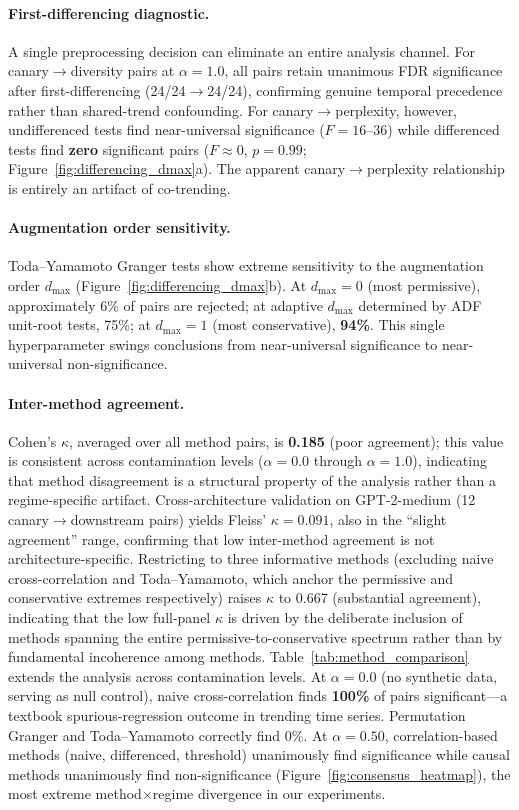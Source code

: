 \paragraph{First-differencing diagnostic.}
A single preprocessing decision can eliminate an entire analysis channel.
For canary$\to$diversity pairs at $\alpha{=}1.0$, all pairs retain unanimous FDR significance after first-differencing (24/24$\to$24/24), confirming genuine temporal precedence rather than shared-trend confounding.
For canary$\to$perplexity, however, undifferenced tests find near-universal significance ($F{=}16$--$36$) while differenced tests find \textbf{zero} significant pairs ($F{\approx}0$, $p{=}0.99$; Figure~\ref{fig:differencing_dmax}a).
The apparent canary$\to$perplexity relationship is entirely an artifact of co-trending.

\paragraph{Augmentation order sensitivity.}
Toda--Yamamoto Granger tests show extreme sensitivity to the augmentation order $d_{\max}$ (Figure~\ref{fig:differencing_dmax}b).
At $d_{\max}{=}0$ (most permissive), approximately 6\% of pairs are rejected; at adaptive $d_{\max}$ determined by ADF unit-root tests, 75\%; at $d_{\max}{=}1$ (most conservative), \textbf{94\%}.
This single hyperparameter swings conclusions from near-universal significance to near-universal non-significance.

\paragraph{Inter-method agreement.}
Cohen's $\kappa$, averaged over all method pairs, is \textbf{0.185} (poor agreement); this value is consistent across contamination levels ($\alpha{=}0.0$ through $\alpha{=}1.0$), indicating that method disagreement is a structural property of the analysis rather than a regime-specific artifact.
Cross-architecture validation on GPT-2-medium (12 canary$\to$downstream pairs) yields Fleiss' $\kappa{=}0.091$, also in the ``slight agreement'' range, confirming that low inter-method agreement is not architecture-specific.
Restricting to three informative methods (excluding naive cross-correlation and Toda--Yamamoto, which anchor the permissive and conservative extremes respectively) raises $\kappa$ to 0.667 (substantial agreement), indicating that the low full-panel $\kappa$ is driven by the deliberate inclusion of methods spanning the entire permissive-to-conservative spectrum rather than by fundamental incoherence among methods.
Table~\ref{tab:method_comparison} extends the analysis across contamination levels.
At $\alpha{=}0.0$ (no synthetic data, serving as null control), naive cross-correlation finds \textbf{100\%} of pairs significant---a textbook spurious-regression outcome in trending time series.
Permutation Granger and Toda--Yamamoto correctly find 0\%.
At $\alpha{=}0.50$, correlation-based methods (naive, differenced, threshold) unanimously find significance while causal methods unanimously find non-significance (Figure~\ref{fig:consensus_heatmap}), the most extreme method$\times$regime divergence in our experiments.

